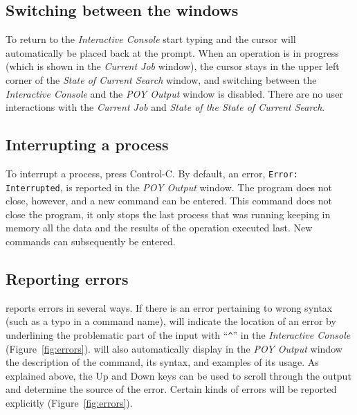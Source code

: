 \subsection{Switching between the windows}
To return to the \emph{Interactive Console} start typing and the cursor will automatically be placed back at the \poy prompt. When an operation is in progress (which is shown in the \emph{Current Job} window), the cursor stays in the upper left corner of the \emph{State of Current Search} window, and switching between the \emph{Interactive Console} and the \emph{POY Output} window is disabled. There are no user interactions with the \emph{Current Job} and \emph{State of the State of Current Search}.

\subsection{Interrupting a process}
To interrupt a process, press Control-C. By default, an error, \texttt{Error:}\\ \texttt{Interrupted}, is reported in the \emph{POY Output} window. The program does not close, however, and a new command can be entered. This command does not close the program, it only stops the last process that was running keeping in memory all the data and the results of the operation executed last. New commands can subsequently be entered.

\subsection{Reporting errors}
\poy reports errors in several ways. If there is an error pertaining to wrong syntax (such as a typo in a command name), \poy will indicate the location of an error by underlining the problematic part of the input with ``\texttt{\^}'' in the \emph{Interactive Console} (Figure~\ref{fig:errors}). \poy will also automatically display in the \emph{POY Output} window the description of the command, its syntax, and examples of its usage. As explained above, the Up and Down keys can be used to scroll through the output and determine the source of the error. Certain kinds of errors will be reported explicitly (Figure~\ref{fig:errors}).

